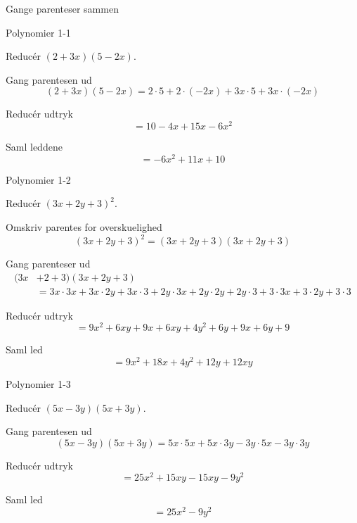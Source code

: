 \documentclass{article}
\begin{document}
Gange parenteser sammen
\tableofcontents
\newpage

\begin{exercise}{Polynomier 1-1}

Reducér $(2+3x)(5-2x)$.


\hint

Gang parentesen ud
\[
(2+3x)(5-2x) = 2 \cdot 5 + 2 \cdot (-2x) + 3x \cdot 5 + 3x \cdot (-2x)
\]

\hint

Reducér udtryk
\[
= 10 -4x + 15x-6x^2
\]


\hint

Saml leddene 
\[
= -6x^2 +11x + 10
\]

\end{exercise}

\newpage

\begin{exercise}{Polynomier 1-2}
	
	Reducér $(3x+2y+3)^2$.
	
	
	\hint
	
	Omskriv parentes for overskuelighed
	\[
	(3x+2y+3)^2 = (3x+2y+3)(3x+2y+3)
	\]
	
	\hint
	
	Gang parenteser ud
	\begin{align*}
	(3x&+2+3)(3x+2y+3) \\
	&= 3x \cdot 3x + 3x \cdot 2y + 3x \cdot 3 + 2y \cdot 3x + 2y \cdot 2y + 2y \cdot 3 + 3 \cdot 3x + 3 \cdot 2y + 3 \cdot 3
	\end{align*}
	
	\hint
	
	Reducér udtryk
	\[
	= 9x^2+6xy+9x+6xy+4y^2+6y+9x+6y+9
	\]
	
	
	\hint
	
	Saml led
	\[
	= 9x^2+18x+4y^2+12y+12xy
	\]
	
\end{exercise}

\newpage

\begin{exercise}{Polynomier 1-3}
	
	Reducér $(5x-3y)(5x+3y)$.
	
	
	\hint
	
	Gang parentesen ud
	\[
	(5x-3y)(5x+3y) = 5x \cdot 5x + 5x \cdot 3y - 3y \cdot 5x - 3y \cdot 3y
	\]
	
	\hint
	
	Reducér udtryk
	\[
	= 25x^2 + 15xy - 15xy - 9y^2
	\]
	
	
	\hint
	
	Saml led
	\[
	= 25x^2-9y^2
	\]
	
\end{exercise}
\end{document}
